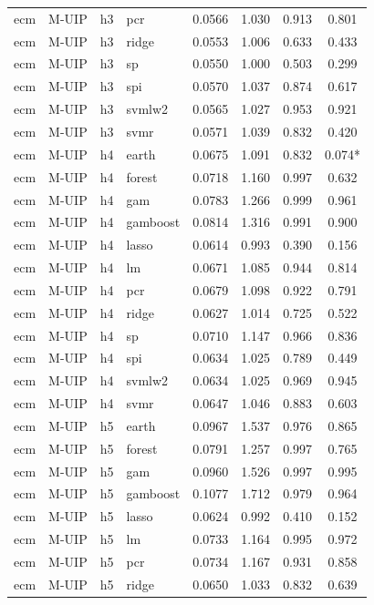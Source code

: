 \begin{ThreePartTable}
\begin{longtable}[t]{llclcccc}
ecm & M-UIP & h3 & pcr & 0.0566 & 1.030 & 0.913 & 0.801\\
ecm & M-UIP & h3 & ridge & 0.0553 & 1.006 & 0.633 & 0.433\\
ecm & M-UIP & h3 & sp & 0.0550 & 1.000 & 0.503 & 0.299\\
ecm & M-UIP & h3 & spi & 0.0570 & 1.037 & 0.874 & 0.617\\
ecm & M-UIP & h3 & svmlw2 & 0.0565 & 1.027 & 0.953 & 0.921\\
ecm & M-UIP & h3 & svmr & 0.0571 & 1.039 & 0.832 & 0.420\\
\addlinespace
ecm & M-UIP & h4 & earth & 0.0675 & 1.091 & 0.832 & 0.074*\\
ecm & M-UIP & h4 & forest & 0.0718 & 1.160 & 0.997 & 0.632\\
ecm & M-UIP & h4 & gam & 0.0783 & 1.266 & 0.999 & 0.961\\
ecm & M-UIP & h4 & gamboost & 0.0814 & 1.316 & 0.991 & 0.900\\
ecm & M-UIP & h4 & lasso & 0.0614 & 0.993 & 0.390 & 0.156\\
ecm & M-UIP & h4 & lm & 0.0671 & 1.085 & 0.944 & 0.814\\
ecm & M-UIP & h4 & pcr & 0.0679 & 1.098 & 0.922 & 0.791\\
ecm & M-UIP & h4 & ridge & 0.0627 & 1.014 & 0.725 & 0.522\\
ecm & M-UIP & h4 & sp & 0.0710 & 1.147 & 0.966 & 0.836\\
ecm & M-UIP & h4 & spi & 0.0634 & 1.025 & 0.789 & 0.449\\
ecm & M-UIP & h4 & svmlw2 & 0.0634 & 1.025 & 0.969 & 0.945\\
ecm & M-UIP & h4 & svmr & 0.0647 & 1.046 & 0.883 & 0.603\\
\addlinespace
ecm & M-UIP & h5 & earth & 0.0967 & 1.537 & 0.976 & 0.865\\
ecm & M-UIP & h5 & forest & 0.0791 & 1.257 & 0.997 & 0.765\\
ecm & M-UIP & h5 & gam & 0.0960 & 1.526 & 0.997 & 0.995\\
ecm & M-UIP & h5 & gamboost & 0.1077 & 1.712 & 0.979 & 0.964\\
ecm & M-UIP & h5 & lasso & 0.0624 & 0.992 & 0.410 & 0.152\\
ecm & M-UIP & h5 & lm & 0.0733 & 1.164 & 0.995 & 0.972\\
ecm & M-UIP & h5 & pcr & 0.0734 & 1.167 & 0.931 & 0.858\\
ecm & M-UIP & h5 & ridge & 0.0650 & 1.033 & 0.832 & 0.639\\

\end{longtable}
\end{ThreePartTable}
